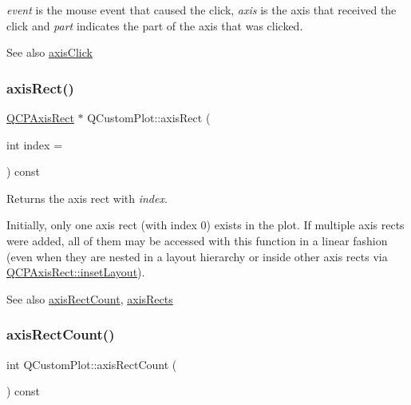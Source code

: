 {\itshape event} is the mouse event that caused the click, {\itshape axis} is the axis that received the click and {\itshape part} indicates the part of the axis that was clicked.

\begin{DoxySeeAlso}{See also}
\hyperlink{class_q_custom_plot_abf635f8b56ab5c16d5de9f358543e82b}{axis\+Click} 
\end{DoxySeeAlso}
\hypertarget{class_q_custom_plot_ae5eefcb5f6ca26689b1fd4f6e25b42f9}{}\label{class_q_custom_plot_ae5eefcb5f6ca26689b1fd4f6e25b42f9} 
\subsubsection{\texorpdfstring{axis\+Rect()}{axisRect()}}
{\footnotesize\ttfamily \hyperlink{class_q_c_p_axis_rect}{Q\+C\+P\+Axis\+Rect} $\ast$ Q\+Custom\+Plot\+::axis\+Rect (\begin{DoxyParamCaption}\item[{int}]{index = {} }\end{DoxyParamCaption}) const}

Returns the axis rect with {\itshape index}.

Initially, only one axis rect (with index 0) exists in the plot. If multiple axis rects were added, all of them may be accessed with this function in a linear fashion (even when they are nested in a layout hierarchy or inside other axis rects via \hyperlink{class_q_c_p_axis_rect_a949f803466619924c7018df4b511ae10}{Q\+C\+P\+Axis\+Rect\+::inset\+Layout}).

\begin{DoxySeeAlso}{See also}
\hyperlink{class_q_custom_plot_a8f85940aaac50efb466287d9d2d04ec6}{axis\+Rect\+Count}, \hyperlink{class_q_custom_plot_a12af771429e2d7e313c8c5d5fca068fe}{axis\+Rects} 
\end{DoxySeeAlso}
\hypertarget{class_q_custom_plot_a8f85940aaac50efb466287d9d2d04ec6}{}\label{class_q_custom_plot_a8f85940aaac50efb466287d9d2d04ec6} 
\subsubsection{\texorpdfstring{axis\+Rect\+Count()}{axisRectCount()}}
{\footnotesize\ttfamily int Q\+Custom\+Plot\+::axis\+Rect\+Count (\begin{DoxyParamCaption}{ }\end{DoxyParamCaption}) const}

